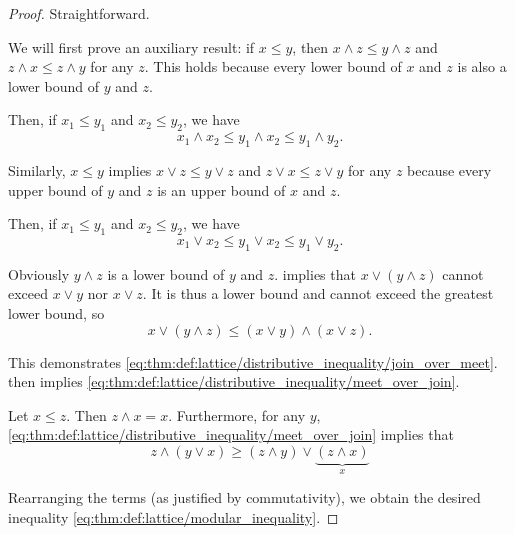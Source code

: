 \begin{proof}
   Straightforward.

   We will first prove an auxiliary result: if \( x \leq y \), then \( x \wedge z \leq y \wedge z \) and \( z \wedge x \leq z \wedge y \) for any \( z \). This holds because every lower bound of \( x \) and \( z \) is also a lower bound of \( y \) and \( z \).

  Then, if \( x_1 \leq y_1 \) and \( x_2 \leq y_2 \), we have
  \begin{equation*}
    x_1 \wedge x_2 \leq y_1 \wedge x_2 \leq y_1 \wedge y_2.
  \end{equation*}

  Similarly, \( x \leq y \) implies \( x \vee z \leq y \vee z \) and \( z \vee x \leq z \vee y \) for any \( z \) because every upper bound of \( y \) and \( z \) is an upper bound of \( x \) and \( z \).

  Then, if \( x_1 \leq y_1 \) and \( x_2 \leq y_2 \), we have
  \begin{equation*}
    x_1 \vee x_2 \leq y_1 \vee x_2 \leq y_1 \vee y_2.
  \end{equation*}

   Obviously \( y \wedge z \) is a lower bound of \( y \) and \( z \).  implies that \( x \vee (y \wedge z) \) cannot exceed \( x \vee y \) nor \( x \vee z \). It is thus a lower bound and cannot exceed the greatest lower bound, so
  \begin{equation*}
    x \vee (y \wedge z) \leq (x \vee y) \wedge (x \vee z).
  \end{equation*}

  This demonstrates \eqref{eq:thm:def:lattice/distributive_inequality/join_over_meet}.  then implies \eqref{eq:thm:def:lattice/distributive_inequality/meet_over_join}.

   Let \( x \leq z \). Then \( z \wedge x = x \). Furthermore, for any \( y \), \eqref{eq:thm:def:lattice/distributive_inequality/meet_over_join} implies that
  \begin{equation*}
    z \wedge (y \vee x) \geq (z \wedge y) \vee \underbrace{(z \wedge x)}_{x}
  \end{equation*}

  Rearranging the terms (as justified by commutativity), we obtain the desired inequality \eqref{eq:thm:def:lattice/modular_inequality}.


\end{proof}
